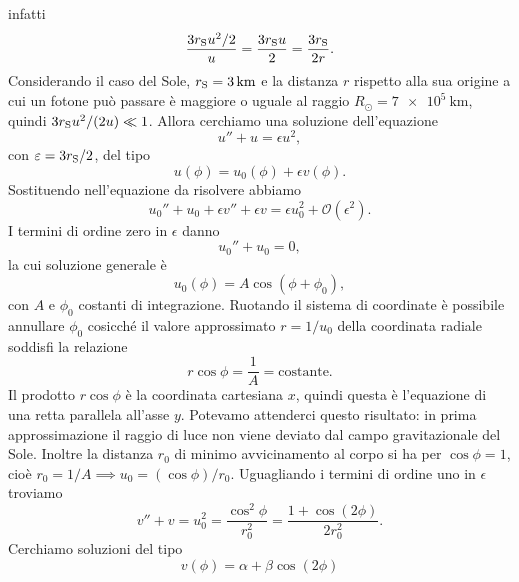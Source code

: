 infatti
\begin{equation}
  \frac{3r_{\textup{S}}u^{2}/2}{u} = \frac{3r_{\textup{S}}u}{2} =
  \frac{3r_{\textup{S}}}{2r}.
\end{equation}
Considerando il caso del Sole, $r_{\textup{S}} = \SI{3}{\kilo\metre}$ e la
distanza $r$ rispetto alla sua origine a cui un fotone può passare è maggiore o
uguale al raggio $R_{\odot} = \SI{7e5}{\kilo\metre}$, quindi
$3r_{\textup{S}}u^{2}/(2u) \ll 1$.  Allora cerchiamo una soluzione dell'equazione
\begin{equation}
  u'' + u = \epsilon u^{2},
\end{equation}
con $\epsilon = 3r_{\textup{S}}/2$, del tipo
\begin{equation}
  u(\phi) = u_{0}(\phi) + \epsilon v(\phi).
\end{equation}
Sostituendo nell'equazione da risolvere abbiamo
\begin{equation}
  \label{eq:deflessione2}
  u_{0}'' + u_{0} + \epsilon v'' + \epsilon v = \epsilon u_{0}^{2} +
  \mathcal{O}(\epsilon^{2}).
\end{equation}
I termini di ordine zero in $\epsilon$ danno
\begin{equation}
  u_{0}'' + u_{0} = 0,
\end{equation}
la cui soluzione generale è
\begin{equation}
  u_{0}(\phi) = A\cos(\phi + \phi_{0}),
\end{equation}
con $A$ e $\phi_{0}$ costanti di integrazione.  Ruotando il sistema di
coordinate è possibile annullare $\phi_{0}$ cosicché il valore approssimato
$r = 1/u_{0}$ della coordinata radiale soddisfi la relazione
\begin{equation}
  r \cos\phi = \frac{1}{A} = \text{costante}.
\end{equation}
Il prodotto $r\cos\phi$ è la coordinata cartesiana $x$, quindi questa è
l'equazione di una retta parallela all'asse $y$.  Potevamo attenderci questo
risultato: in prima approssimazione il raggio di luce non viene deviato dal
campo gravitazionale del Sole.  Inoltre la distanza $r_{0}$ di minimo
avvicinamento al corpo si ha per $\cos\phi = 1$, cioè
$r_{0} = 1/A \implies u_{0} = (\cos\phi)/r_{0}$.  Uguagliando i termini di
ordine uno in $\epsilon$ troviamo
\begin{equation}
  \label{eq:deflessione3}
  v'' + v = u_{0}^{2} = \frac{\cos^{2}\phi}{r_{0}^{2}} = \frac{1 +
    \cos(2\phi)}{2r_{0}^{2}}.
\end{equation}
Cerchiamo soluzioni del tipo
\begin{equation}
  v(\phi) = \alpha + \beta\cos(2\phi)
\end{equation}
